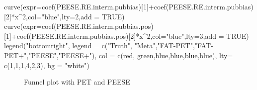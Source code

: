 \documentclass[
]{book}
\newenvironment{Shaded}{\begin{snugshade}}{\end{snugshade}}
\newcommand{\AttributeTok}[1]{\textcolor[rgb]{0.77,0.63,0.00}{#1}}
\newcommand{\ConstantTok}[1]{\textcolor[rgb]{0.00,0.00,0.00}{#1}}
\newcommand{\DecValTok}[1]{\textcolor[rgb]{0.00,0.00,0.81}{#1}}
\newcommand{\FunctionTok}[1]{\textcolor[rgb]{0.00,0.00,0.00}{#1}}
\newcommand{\NormalTok}[1]{#1}
\newcommand{\SpecialCharTok}[1]{\textcolor[rgb]{0.00,0.00,0.00}{#1}}
\newcommand{\StringTok}[1]{\textcolor[rgb]{0.31,0.60,0.02}{#1}}
\theoremstyle{definition}
\theoremstyle{definition}
\theoremstyle{definition}
\theoremstyle{definition}
\theoremstyle{remark}
\begin{document}
\begin{Shaded}
\begin{Highlighting}[]
\FunctionTok{curve}\NormalTok{(}\AttributeTok{expr=}\FunctionTok{coef}\NormalTok{(PEESE.RE.interm.pubbias)[}\DecValTok{1}\NormalTok{]}\SpecialCharTok{+}\FunctionTok{coef}\NormalTok{(PEESE.RE.interm.pubbias)[}\DecValTok{2}\NormalTok{]}\SpecialCharTok{*}\NormalTok{x}\SpecialCharTok{\^{}}\DecValTok{2}\NormalTok{,}\AttributeTok{col=}\StringTok{"blue"}\NormalTok{,}\AttributeTok{lty=}\DecValTok{2}\NormalTok{,}\AttributeTok{add =} \ConstantTok{TRUE}\NormalTok{)}
\FunctionTok{curve}\NormalTok{(}\AttributeTok{expr=}\FunctionTok{coef}\NormalTok{(PEESE.RE.interm.pubbias.pos)[}\DecValTok{1}\NormalTok{]}\SpecialCharTok{+}\FunctionTok{coef}\NormalTok{(PEESE.RE.interm.pubbias.pos)[}\DecValTok{2}\NormalTok{]}\SpecialCharTok{*}\NormalTok{x}\SpecialCharTok{\^{}}\DecValTok{2}\NormalTok{,}\AttributeTok{col=}\StringTok{"blue"}\NormalTok{,}\AttributeTok{lty=}\DecValTok{3}\NormalTok{,}\AttributeTok{add =} \ConstantTok{TRUE}\NormalTok{)}
\FunctionTok{legend}\NormalTok{(}\StringTok{"bottomright"}\NormalTok{,}
       \AttributeTok{legend =} \FunctionTok{c}\NormalTok{(}\StringTok{"Truth"}\NormalTok{, }\StringTok{"Meta"}\NormalTok{,}\StringTok{"FAT{-}PET"}\NormalTok{,}\StringTok{"FAT{-}PET+"}\NormalTok{,}\StringTok{"PEESE"}\NormalTok{,}\StringTok{"PEESE+"}\NormalTok{),}
       \AttributeTok{col =} \FunctionTok{c}\NormalTok{(}\StringTok{\textquotesingle{}red\textquotesingle{}}\NormalTok{, }\StringTok{\textquotesingle{}green\textquotesingle{}}\NormalTok{,}\StringTok{\textquotesingle{}blue\textquotesingle{}}\NormalTok{,}\StringTok{\textquotesingle{}blue\textquotesingle{}}\NormalTok{,}\StringTok{\textquotesingle{}blue\textquotesingle{}}\NormalTok{,}\StringTok{\textquotesingle{}blue\textquotesingle{}}\NormalTok{),}
       \AttributeTok{lty=} \FunctionTok{c}\NormalTok{(}\DecValTok{1}\NormalTok{,}\DecValTok{1}\NormalTok{,}\DecValTok{1}\NormalTok{,}\DecValTok{4}\NormalTok{,}\DecValTok{2}\NormalTok{,}\DecValTok{3}\NormalTok{),}
       \AttributeTok{bg =} \StringTok{"white"}\NormalTok{)}
\end{Highlighting}
\end{Shaded}

\begin{figure}[htbp]

{\centering {}

}

\caption{Funnel plot with PET and PEESE}\label{fig:FunnelPlotREPETPEESE}
\end{figure}
\end{document}
